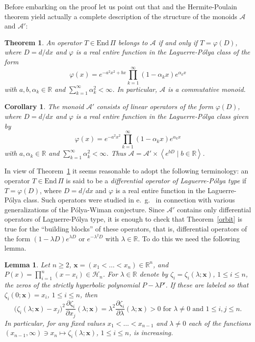 \documentclass[10pt,twoside,a4paper,reqno]{amsart}
\theoremstyle{plain}
\newtheorem{theo+}           {Theorem}
\newtheorem{coro+}           {Corollary}
\newtheorem{lemm+}           {Lemma}
\theoremstyle{definition}
\theoremstyle{remark}
\newenvironment{theorem}{\begin{theo+}}{\end{theo+}}
\newenvironment{corollary}{\begin{coro+}}{\end{coro+}}
\newenvironment{lemma}{\begin{lemm+}}{\end{lemm+}}
\newcommand {\bR} {\mathbb {R}}
\newcommand {\bx} {\mathbf {x}}
\newcommand {\ze} {\zeta}
\newcommand {\al} {\alpha}
\newcommand {\la} {\lambda}
\newcommand {\vf} {\varphi}
\newcommand {\calH} {\mathcal {H}}
\newcommand {\calA} {\mathcal {A}}
\newcommand {\vP} {\varPi}
\newcommand {\E} {\text{End}\,}
\begin{document}
Before embarking on the proof let us point out that 
\cite[Theorem~1]{CPP} and the Hermite-Poulain theorem yield actually a 
complete description of the structure of the monoids $\calA$ and $\calA'$:

\begin{theorem}\label{LP}
An operator $T\in \E\vP$ belongs to $\calA$ if and only if $T=\vf(D)$, where 
$D=d/dx$ and $\vf$ is a real entire function in the Laguerre-P\'olya class of 
the form
$$\vf(x)=e^{-a^{2}x^{2}+bx}\prod_{k=1}^{\infty}(1-\al_{k}x)e^{\al_{k}x}$$
with $a,b,\al_{k}\in \bR$ and $\sum_{k=1}^{\infty}\al_{k}^2<\infty$. In 
particular, $\calA$ is a commutative monoid.
\end{theorem}

\begin{corollary}\label{LP'}
The monoid $\calA'$ consists of linear operators of the form $\vf(D)$, 
where $D=d/dx$ and $\vf$ is a real entire function in the Laguerre-P\'olya 
class given by 
$$\vf(x)=e^{-a^{2}x^{2}}\prod_{k=1}^{\infty}(1-\al_{k}x)e^{\al_{k}x}$$
with $a,\al_{k}\in \bR$ and $\sum_{k=1}^{\infty}\al_{k}^2<\infty$. Thus 
$\calA=\calA'\times \left\langle e^{bD}\mid b\in \bR\right\rangle$.
\end{corollary}

In view of Theorem~\ref{LP} it seems reasonable to adopt the following 
terminology: an operator $T\in \E\vP$ 
is said to be a {\em differential operator of Laguerre-P\'olya type} if 
$T=\vf(D)$, where $D=d/dx$ and $\vf$ is a real entire function in the 
Laguerre-P\'olya class. Such operators were studied in e.~g.~\cite{CC2} in 
connection with various generalizations of the P\'olya-Wiman 
conjecture. Since $\calA'$ contains only differential 
operators of Laguerre-P\'olya type, it is enough to check that 
Theorem~\ref{orbit} is true for the ``building blocks'' of these operators, 
that is, differential operators of the form $(1-\la D)e^{\la D}$ or 
$e^{-\la^{2} D}$ with $\la\in \bR$. To do this we need the following lemma.

\begin{lemma}\label{ind}
Let $n\ge 2$, $\bx=(x_1<\ldots<x_n)\in \bR^n$, and 
$P(x)=\prod_{i=1}^{n}(x-x_i)\in \calH_n$. For $\la\in \bR$ denote by 
$\ze_i=\ze_{i}(\la;\bx)$, $1\le i\le n$, the zeros of the strictly hyperbolic 
polynomial $P-\la P'$. If these are labeled so that 
$\ze_{i}(0;\bx)=x_i$, $1\le i\le n$, then
$$\big(\ze_{i}(\la;\bx)-x_j\big)^{2}
\frac{\partial \ze_i}{\partial x_j}(\la;\bx)
=\la^{2}\frac{\partial \ze_i}{\partial \la}(\la;\bx)>0\text{ for }
\la\neq 0\text{ and }1\le i,j\le n.$$
In particular, for any fixed values $x_1<\ldots<x_{n-1}$ and $\la\neq 0$ each 
of the functions $(x_{n-1},\infty)\ni x_n\mapsto \ze_{i}(\la;\bx)$, 
$1\le i\le n$, is increasing.
\end{lemma}
\end{document}
